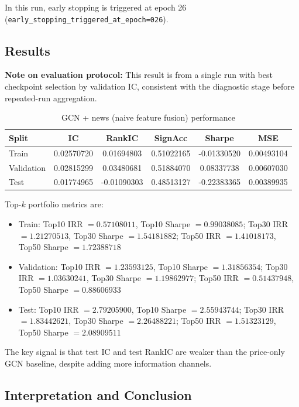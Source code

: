 In this run, early stopping is triggered at epoch 26 (\texttt{early\_stopping\_triggered\_at\_epoch=026}).

\subsection{Results}

\textbf{Note on evaluation protocol:} This result is from a single run with best checkpoint selection by validation IC, consistent with the diagnostic stage before repeated-run aggregation.

\begin{table}[htbp]
\centering
\caption{GCN + news (naive feature fusion) performance}
\label{tab:gcn-news-results}
\begin{tabular}{lccccc}
\hline
Split & IC & RankIC & SignAcc & Sharpe & MSE \\
\hline
Train & 0.02570720 & 0.01694803 & 0.51022165 & -0.01330520 & 0.00493104 \\
Validation & 0.02815299 & 0.03480681 & 0.51884070 & 0.08337738 & 0.00607030 \\
Test & 0.01774965 & -0.01090303 & 0.48513127 & -0.22383365 & 0.00389935 \\
\hline
\end{tabular}
\end{table}

Top-$k$ portfolio metrics are:
\begin{itemize}
\item Train: Top10 IRR $=0.57108011$, Top10 Sharpe $=0.99038085$; Top30 IRR $=1.21270513$, Top30 Sharpe $=1.54181882$; Top50 IRR $=1.41018173$, Top50 Sharpe $=1.72388718$
\item Validation: Top10 IRR $=1.23593125$, Top10 Sharpe $=1.31856354$; Top30 IRR $=1.03630241$, Top30 Sharpe $=1.19862977$; Top50 IRR $=0.51437948$, Top50 Sharpe $=0.88606933$
\item Test: Top10 IRR $=2.79205900$, Top10 Sharpe $=2.55943744$; Top30 IRR $=1.83442621$, Top30 Sharpe $=2.26488221$; Top50 IRR $=1.51323129$, Top50 Sharpe $=2.08909511$
\end{itemize}

The key signal is that test IC and test RankIC are weaker than the price-only GCN baseline, despite adding more information channels.

\subsection{Interpretation and Conclusion}

